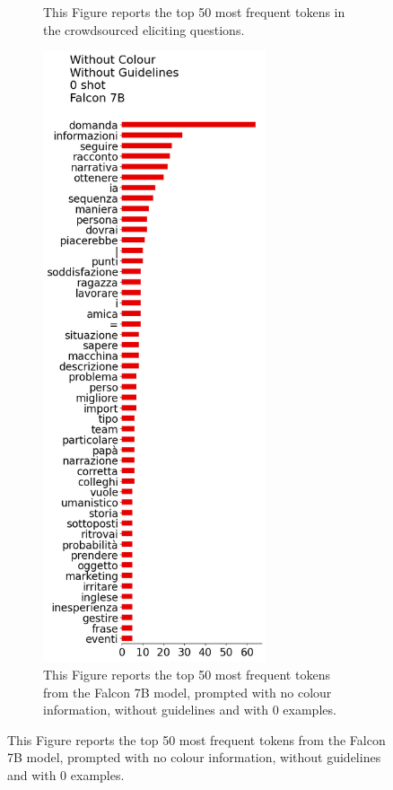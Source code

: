 \begin{figure}[!htbp]
\begin{subfigure}[t]{0.25\textwidth}
        \caption{This Figure reports the top 50 most frequent tokens in the crowdsourced eliciting questions.}
        \label{sub:persona-narrative-elicitation-comparison-distribution-human}
    \end{subfigure}
    \hspace{-1.5cm}
    \begin{subfigure}[t]{0.45\textwidth}
        \centering
        \includegraphics[height=18cm]{assets/imgs/tokens-vertical/no_color/no_guidelines/0_shot/token_distribution_no_color_no_guidelines_0_shot_falcon-7b.png}
        \caption{This Figure reports the top 50 most frequent tokens from the Falcon 7B model, prompted with no colour information, without guidelines and with 0 examples.}

\end{subfigure}
\end{figure}
